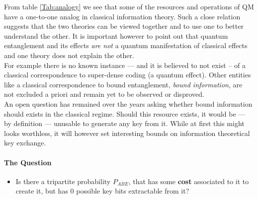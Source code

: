 From table \ref{Tab:analogy} we see that some of the resources and operations of QM have a one-to-one analog in classical information theory. 
Such a close relation suggests that the two theories can be viewed together and to use one to better understand the other. 
It is important however to point out that quantum entanglement and its effects \emph{are not} a quantum manifestation of classical effects and one theory does not explain the other. \\
For example there is no known instance --- and it is believed to not exist -- of a classical correspondence to super-dense coding (a quantum effect). Other entities like a classical correspondence to bound entanglement, \emph{bound information}, are not excluded a priori and remain yet to be observed or disproved.\\

An open question has remained over the years asking whether bound information should exists in the classical regime.
Should this resource exists, it would be --- by definition --- unusable to generate any key from it.
While at first this might looks worthless, it will however set interesting bounds on information theoretical key exchange.\\

\paragraph*{The Question}
\begin{itemize}
		\item[] Is there a tripartite probability $P_{ABE}$, that has some \textbf{cost} associated to it to create it, but has $0$ possible key bits extractable from it? 
\end{itemize}


	
